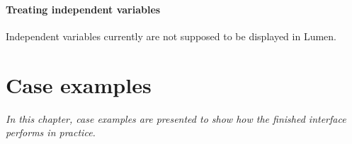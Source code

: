 \documentclass{article}
\begin{document}
\paragraph{Treating independent variables}
Independent variables currently are not supposed to be displayed in Lumen.


\section{Case examples}

\textit{In this chapter, case examples are presented to show how the finished interface performs in practice.}
\end{document}
